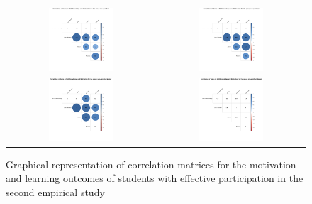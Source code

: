 \begin{figure}[htb]
 \caption{Graphical representation of correlation matrices for the motivation and learning outcomes of students with effective participation in the second empirical study}
 \label{fig:effective-correlation-matrices-second-study}
 \centering
 \begin{tabular}{cc}
 \includegraphics[width=0.45\textwidth]{images/chap-evaluation/corr-effective-second/non-gamified1.png}&
 \includegraphics[width=0.45\textwidth]{images/chap-evaluation/corr-effective-second/ont-gamified1.png}\\
 \includegraphics[width=0.45\textwidth]{images/chap-evaluation/corr-effective-second/non-gamifiedMaster1.png}&
 \includegraphics[width=0.45\textwidth]{images/chap-evaluation/corr-effective-second/ont-gamifiedMaster1.png}\\

\end{tabular}
\end{figure}
